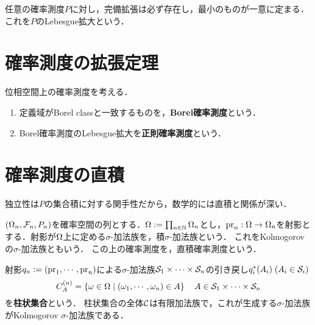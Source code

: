 \documentclass[uplatex,dvipdfmx]{jsreport}
\begin{document}
\begin{proposition}
    任意の確率測度$P$に対し，完備拡張は必ず存在し，最小のものが一意に定まる．これを$P$のLebesgue拡大という．
\end{proposition}

\section{確率測度の拡張定理}

\begin{definition}\label{def-regular-measure}
    位相空間上の確率測度を考える．
    \begin{enumerate}
        \item 定義域がBorel classと一致するものを，\textbf{Borel確率測度}という．
        \item Borel確率測度のLebesgue拡大を\textbf{正則確率測度}という．
    \end{enumerate}
\end{definition}

\section{確率測度の直積}

\begin{tcolorbox}[colframe=ForestGreen, colback=ForestGreen!10!white,breakable,colbacktitle=ForestGreen!40!white,coltitle=black,fonttitle=\bfseries\sffamily,
title=]
    独立性は$P$の集合積に対する関手性だから，数学的には直積と関係が深い．
\end{tcolorbox}

\begin{definition}
    $(\Omega_n,\mathcal{F}_n,P_n)$を確率空間の列とする．$\Omega:=\prod_{n\in\mathbb{N}}\Omega_n$とし，$\mathrm{pr}_n:\Omega\to\Omega_n$を射影とする．射影が$\Omega$上に定める$\sigma$-加法族を，積$\sigma$-加法族という．
    これをKolmogorovの$\sigma$-加法族ともいう．
    この上の確率測度を，直積確率測度という．
\end{definition}
\begin{remark}\label{remark-cylinder-sets}
    射影$q_n:=(\mathrm{pr}_1,\cdots,\mathrm{pr}_n)$による$\sigma$-加法族$\mathcal{S}_1\times\cdots\times\mathcal{S}_n$の引き戻し$q_i^*(A_i)\;(A_i\in\mathcal{S}_i)$
    \[C_A^{(n)}=\left\{\omega\in\Omega\mid(\omega_1,\cdots,\omega_n)\in A\right\}\quad A\in\mathcal{S}_1\times\cdots\times\mathcal{S}_n\]
    を\textbf{柱状集合}という．
    柱状集合の全体$\mathcal{C}$は有限加法族で，これが生成する$\sigma$-加法族がKolmogorov $\sigma$-加法族である．
\end{remark}
\end{document}
